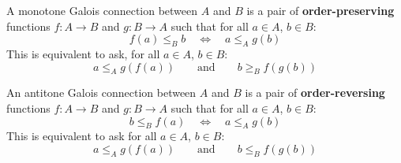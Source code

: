 \begin{definition}
A monotone Galois connection between $A$ and $B$ is a pair of \textbf{order-preserving} functions $f:A\to B$ and $g:B\to A$ such that for all $a\in A$, $b\in B$:
\begin{equation}
    f(a) \leq_B b \quad \Leftrightarrow \quad a \leq_A g(b)
\end{equation}
This is equivalent to ask, for all $a\in A$, $b\in B$:
\begin{equation}
    a\leq_A g(f(a)) \qquad \text{and} \qquad b\geq_{B}f(g(b))
\end{equation}
\end{definition}



\begin{definition}
An antitone Galois connection between $A$ and $B$ is a pair of \textbf{order-reversing} functions $f\colon A\to B$ and $g \colon B\to A$ such that for all $a\in A$, $b\in B$:
\begin{equation}
    b \leq_B f(a) \quad \Leftrightarrow \quad a \leq_A g(b) 
\end{equation}
This is equivalent to ask for all $a\in A$, $b\in B$:
\begin{equation}
a \leq_A g(f(a))   \qquad \text{and} \qquad  b \leq_B f(g(b))
\end{equation}
\end{definition}



